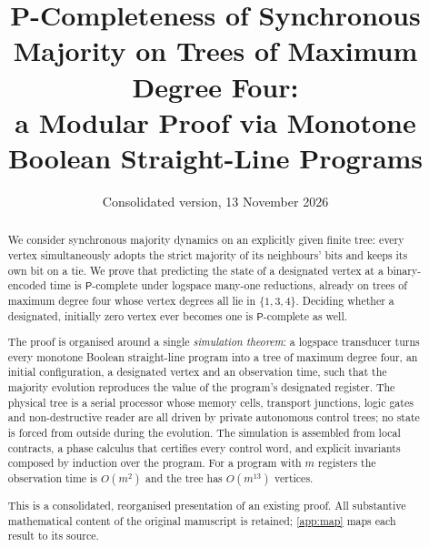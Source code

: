 \documentclass[11pt]{article}
\title{P-Completeness of Synchronous Majority on Trees of Maximum Degree Four:\\
a Modular Proof via Monotone Boolean Straight-Line Programs}
\author{}
\date{Consolidated version, 13 November 2026}
\newcommand{\Ptime}{\mathsf{P}}
\begin{document}
\maketitle

\begin{abstract}
We consider synchronous majority dynamics on an explicitly given finite tree: every vertex
simultaneously adopts the strict majority of its neighbours' bits and keeps its own bit on a tie.
We prove that predicting the state of a designated vertex at a binary-encoded time is
$\Ptime$-complete under logspace many-one reductions, already on trees of maximum degree four whose
vertex degrees all lie in $\{1,3,4\}$. Deciding whether a designated, initially zero vertex ever
becomes one is $\Ptime$-complete as well.

The proof is organised around a single \emph{simulation theorem}: a logspace transducer turns every
monotone Boolean straight-line program into a tree of maximum degree four, an initial configuration,
a designated vertex and an observation time, such that the majority evolution reproduces the value
of the program's designated register. The physical tree is a serial processor whose memory cells,
transport junctions, logic gates and non-destructive reader are all driven by private autonomous
control trees; no state is forced from outside during the evolution. The simulation is assembled
from local contracts, a phase calculus that certifies every control word, and explicit invariants
composed by induction over the program. For a program with $m$ registers the observation time is
$O(m^2)$ and the tree has $O(m^{13})$ vertices.

This is a consolidated, reorganised presentation of an existing proof. All substantive mathematical
content of the original manuscript is retained; \cref{app:map} maps each result to its source.
\end{abstract}

\setcounter{tocdepth}{2}
\tableofcontents












\appendix

\end{document}
